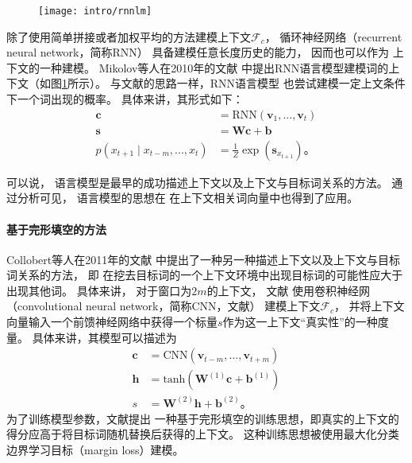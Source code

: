 \begin{figure}[t]
	\centering
	\texttt{[image: intro/rnnlm]}
	\label{fig:intro:rnnlm}
\end{figure}
除了使用简单拼接或者加权平均的方法建模上下文$\mathcal{F}_{c}$，
循环神经网络（recurrent neural network，简称RNN）
具备建模任意长度历史的能力，
因而也可以作为
上下文的一种建模。
Mikolov等人在2010年的文献
中提出RNN语言模型建模词的上下文（如图\ref{fig:intro:rnnlm}所示）。
与文献的思路一样，RNN语言模型
也尝试建模一定上文条件下一个词出现的概率。
具体来讲，其形式如下：
\begin{align*}
\mathbf{c} &= \text{RNN}(\mathbf{v}_1, ..., \mathbf{v}_t) \\
\mathbf{s} &= \mathbf{W} \mathbf{c}  + \mathbf{b} \\
p(x_{t+1} \mid x_{t-m}, ..., x_t) &= \frac{1}{Z} \exp(\mathbf{s}_{x_{t+1}})\text{。}
\end{align*}

可以说，
语言模型是最早的成功描述上下文以及上下文与目标词关系的方法。
通过分析可见，
语言模型的思想在
在上下文相关词向量中也得到了应用。

\paragraph{基于完形填空的方法}
Collobert等人在2011年的文献
中提出了一种另一种描述上下文以及上下文与目标词关系的方法，
即
在挖去目标词的一个上下文环境中出现目标词的可能性应大于出现其他词。
具体来讲，
对于窗口为$2m$的上下文，
文献
使用卷积神经网（convolutional neural network，简称CNN，文献）
建模上下文$\mathcal{F}_{c}$，
并将上下文向量输入一个前馈神经网络中获得一个标量$s$作为这一上下文``真实性''的一种度量。
具体来讲，其模型可以描述为
\begin{align*}
\mathbf{c} &= \text{CNN}(\mathbf{v}_{t-m},..., \mathbf{v}_{t+m}) \\
\mathbf{h} & = \text{tanh}(\mathbf{W}^{(1)}  \mathbf{c} + \mathbf{b}^{(1)}) \\
s &= \mathbf{W}^{(2)} \mathbf{h} +\textbf{b}^{(2)} \text{。}
\end{align*}
为了训练模型参数，文献提出
一种基于完形填空的训练思想，即真实的上下文的得分应高于将目标词随机替换后获得的上下文。
这种训练思想被使用最大化分类边界学习目标（margin loss）建模。

